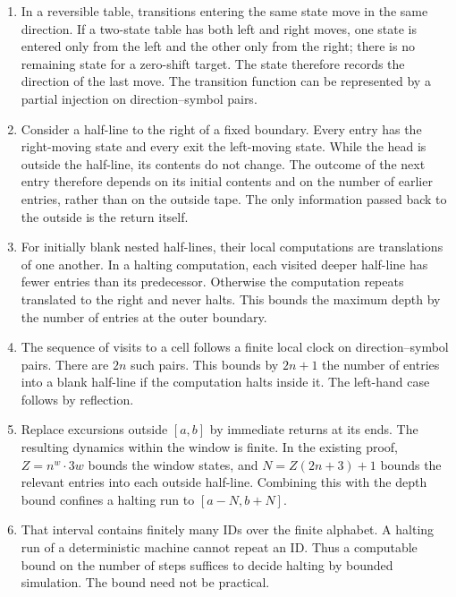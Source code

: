 \begin{enumerate}
\item In a reversible table, transitions entering the same state move in
the same direction. If a two-state table has both left and right moves,
one state is entered only from the left and the other only from the right;
there is no remaining state for a zero-shift target. The state therefore
records the direction of the last move. The transition function can be
represented by a partial injection on direction--symbol pairs.

\item Consider a half-line to the right of a fixed boundary. Every entry
has the right-moving state and every exit the left-moving state. While the
head is outside the half-line, its contents do not change. The outcome of
the next entry therefore depends on its initial contents and on the number
of earlier entries, rather than on the outside tape. The only information
passed back to the outside is the return itself.

\item For initially blank nested half-lines, their local computations are
translations of one another. In a halting computation, each visited deeper
half-line has fewer entries than its predecessor. Otherwise the computation
repeats translated to the right and never halts. This bounds the maximum
depth by the number of entries at the outer boundary.

\item The sequence of visits to a cell follows a finite local clock on
direction--symbol pairs. There are $2n$ such pairs. This bounds by $2n+1$
the number of entries into a blank half-line if the computation halts
inside it. The left-hand case follows by reflection.

\item Replace excursions outside $[a,b]$ by immediate returns at its ends.
The resulting dynamics within the window is finite. In the existing proof,
$Z=n^w\cdot 3w$ bounds the window states, and
$N=Z(2n+3)+1$ bounds the relevant entries into each outside half-line.
Combining this with the depth bound confines a halting run to
$[a-N,b+N]$.

\item That interval contains finitely many IDs over the finite alphabet.
A halting run of a deterministic machine cannot repeat an ID. Thus a
computable bound on the number of steps suffices to decide halting by
bounded simulation. The bound need not be practical.
\end{enumerate}

